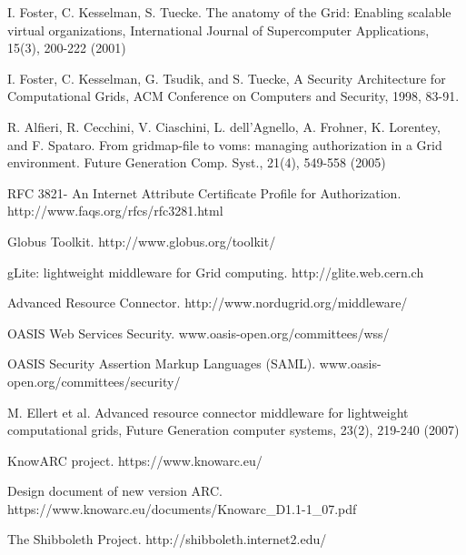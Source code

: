 \documentclass[twocolumn]{svjour3}         %
\begin{document}
\begin{thebibliography}{}
%
%

I. Foster, C. Kesselman, S. Tuecke. The anatomy of the Grid: Enabling scalable virtual organizations, International Journal of Supercomputer Applications, 15(3), 200-222 (2001)

I. Foster, C. Kesselman, G. Tsudik, and S. Tuecke, A Security Architecture for Computational Grids, ACM Conference on Computers and Security, 1998, 83-91.

R. Alfieri, R. Cecchini, V. Ciaschini, L. dell’Agnello, A. Frohner, K. Lorentey, and F. Spataro. From gridmap-file to voms: managing authorization in a Grid environment. Future Generation Comp. Syst., 21(4), 549-558 (2005)

RFC 3821- An Internet Attribute Certificate Profile for Authorization. http://www.faqs.org/rfcs/rfc3281.html

Globus Toolkit. http://www.globus.org/toolkit/

gLite: lightweight middleware for Grid computing. http://glite.web.cern.ch

Advanced Resource Connector. http://www.nordugrid.org/middleware/

OASIS Web Services Security. www.oasis-open.org/committees/wss/

OASIS Security Assertion Markup Languages (SAML). www.oasis-open.org/committees/security/

M. Ellert et al. Advanced resource connector middleware for lightweight computational grids, Future Generation computer systems, 23(2), 219-240 (2007)

KnowARC project.  https://www.knowarc.eu/

Design document of new version ARC. https://www.knowarc.eu/documents/Knowarc\_D1.1-1\_07.pdf

The Shibboleth Project. http://shibboleth.internet2.edu/


\end{thebibliography}
\end{document}
